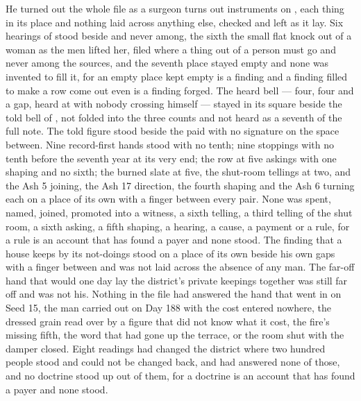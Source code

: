 He turned out the whole file as a surgeon turns out instruments on , each thing in its place and nothing laid across anything else, checked and left as it lay. Six hearings of  stood beside and never among, the sixth the small flat knock out of a woman as the men lifted her, filed where a thing out of a person must go and never among the sources, and the seventh place stayed empty and none was invented to fill it, for an empty place kept empty is a finding and a finding filled to make a row come out even is a finding forged. The heard bell --- four, four and a gap, heard at  with nobody crossing himself --- stayed in its square beside the told bell of , not folded into the three counts and not heard as a seventh of the full note. The told figure stood beside the paid with no signature on the space between. Nine record-first hands stood with no tenth; nine stoppings with no tenth before the seventh year at its very end; the row at five askings with one shaping and no sixth; the burned slate at five, the shut-room tellings at two, and the Ash 5 joining, the Ash 17 direction, the fourth shaping and the Ash 6 turning each on a place of its own with a finger between every pair. None was spent, named, joined, promoted into a witness, a sixth telling, a third telling of the shut room, a sixth asking, a fifth shaping, a hearing, a cause, a payment or a rule, for a rule is an account that has found a payer and none stood. The finding that a house keeps by its not-doings stood on a place of its own beside his own gaps with a finger between and was not laid across the absence of any man. The far-off hand that would one day lay the district's private keepings together was still far off and was not his. Nothing in the file had answered the hand that went in on Seed 15, the man carried out on Day 188 with the cost entered nowhere, the dressed grain read over by a figure that did not know what it cost, the fire's missing fifth, the word that had gone up the terrace, or the room shut with the damper closed. Eight readings had changed the district where two hundred people stood and could not be changed back, and had answered none of those, and no doctrine stood up out of them, for a doctrine is an account that has found a payer and none stood.

\scenebreak

